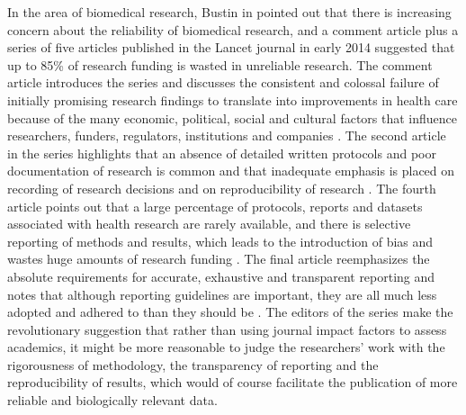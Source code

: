 In the area of biomedical research, Bustin in \cite{bustin2015reproducibility} pointed out that there is increasing concern about the reliability of biomedical research, and a comment article plus a series of five articles published in the Lancet journal in early 2014 suggested that up to 85\% of research funding is wasted in unreliable research. The comment article introduces the series and discusses the consistent and colossal failure of initially promising research findings to translate into improvements in health care because of the many economic, political, social and cultural factors that influence researchers, funders, regulators, institutions and companies \cite{macleod2014biomedical}. 
The second article in the series highlights that an absence of detailed written protocols and poor documentation of
research is common and that inadequate emphasis is placed on recording of research decisions and on reproducibility of research \cite{ioannidis2014increasing}. 
The fourth article points out that a large percentage of protocols, reports and datasets associated with health research are rarely available, and there is selective reporting of methods and results, which leads to the introduction of bias and wastes huge amounts of research funding \cite{chan2014increasing}. The final article reemphasizes the absolute requirements for accurate, exhaustive and transparent reporting and notes that although reporting guidelines are important, they are all much less adopted and adhered to than they should be \cite{glasziou2014reducing}. The editors of the series make the revolutionary suggestion that rather than using journal impact factors to assess academics, it might be more reasonable to judge the researchers' work with the rigorousness of methodology, the transparency of reporting and the reproducibility of results, which would of course facilitate the publication of more reliable and biologically relevant data.


